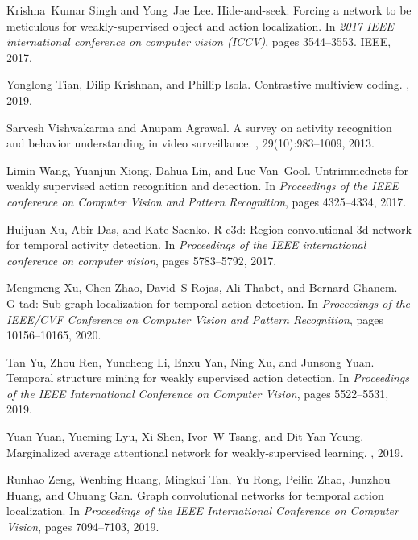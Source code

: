 \documentclass[final]{cvpr}
\begin{document}
\begin{table*}[t]
{\begin{thebibliography}{10}
Krishna~Kumar Singh and Yong~Jae Lee.
\newblock Hide-and-seek: Forcing a network to be meticulous for
  weakly-supervised object and action localization.
\newblock In {\em 2017 IEEE international conference on computer vision
  (ICCV)}, pages 3544--3553. IEEE, 2017.

Yonglong Tian, Dilip Krishnan, and Phillip Isola.
\newblock Contrastive multiview coding.
, 2019.

Sarvesh Vishwakarma and Anupam Agrawal.
\newblock A survey on activity recognition and behavior understanding in video
  surveillance.
, 29(10):983--1009, 2013.

Limin Wang, Yuanjun Xiong, Dahua Lin, and Luc Van~Gool.
\newblock Untrimmednets for weakly supervised action recognition and detection.
\newblock In {\em Proceedings of the IEEE conference on Computer Vision and
  Pattern Recognition}, pages 4325--4334, 2017.

Huijuan Xu, Abir Das, and Kate Saenko.
\newblock R-c3d: Region convolutional 3d network for temporal activity
  detection.
\newblock In {\em Proceedings of the IEEE international conference on computer
  vision}, pages 5783--5792, 2017.

Mengmeng Xu, Chen Zhao, David~S Rojas, Ali Thabet, and Bernard Ghanem.
\newblock G-tad: Sub-graph localization for temporal action detection.
\newblock In {\em Proceedings of the IEEE/CVF Conference on Computer Vision and
  Pattern Recognition}, pages 10156--10165, 2020.

Tan Yu, Zhou Ren, Yuncheng Li, Enxu Yan, Ning Xu, and Junsong Yuan.
\newblock Temporal structure mining for weakly supervised action detection.
\newblock In {\em Proceedings of the IEEE International Conference on Computer
  Vision}, pages 5522--5531, 2019.

Yuan Yuan, Yueming Lyu, Xi Shen, Ivor~W Tsang, and Dit-Yan Yeung.
\newblock Marginalized average attentional network for weakly-supervised
  learning.
, 2019.

Runhao Zeng, Wenbing Huang, Mingkui Tan, Yu Rong, Peilin Zhao, Junzhou Huang,
  and Chuang Gan.
\newblock Graph convolutional networks for temporal action localization.
\newblock In {\em Proceedings of the IEEE International Conference on Computer
  Vision}, pages 7094--7103, 2019.


\end{thebibliography}}
\end{table*}
\end{document}
